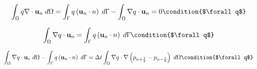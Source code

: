 \documentclass[11pt,a4paper]{article}
\begin{document}
\begin{dmath}
  \int_\Omega q \nabla \cdot {\bf u}_{n} \; d\Omega = \int_\Upgamma q \left( {\bf u}_{n} \cdot n \right) \; d\Upgamma - \int_\Omega \nabla q \cdot {\bf u}_{n} = 0 \condition{$\forall q$}
\end{dmath}

\begin{dmath}
 \int_\Omega \nabla q \cdot {\bf u}_{n} = \int_\Upgamma q \left( {\bf u}_{n} \cdot n \right) \; d\Upgamma \condition{$\forall q$}
\end{dmath}

\begin{dmath}
  \int_\Omega \nabla q \cdot {\bf u}_* \; d\Omega - \int_\Upgamma q \left( {\bf u}_{n} \cdot n \right) \; d\Upgamma = \Delta t \int_\Omega \nabla q \cdot \nabla \left(p_{n+\frac{1}{2}} - p_{n-\frac{1}{2}} \right) \; d\Omega  \condition{$\forall q$}
\end{dmath}









\end{document}
